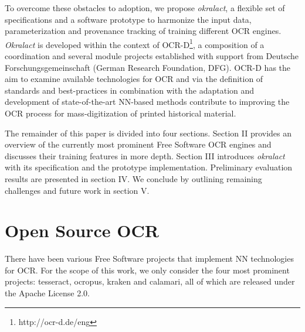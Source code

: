 \documentclass[conference]{IEEEtran}
\begin{document}
To overcome these obstacles to adoption, we propose
\textit{okralact}, a flexible set of specifications and a software
prototype to harmonize the input data, parameterization and
provenance tracking of training different OCR engines.
\textit{Okralact} is developed within the context of
OCR-D\footnote{http://ocr-d.de/eng}, a composition of a
coordination and several module projects established with support
from Deutsche Forschungsgemeinschaft (German Research Foundation,
DFG). OCR-D has the aim to examine available technologies for OCR
and via the definition of standards and best-practices in
combination with the adaptation and development of state-of-the-art
NN-based methods contribute to improving the OCR process for
mass-digitization of printed historical
material.\cite{neudecker2019datech}  



The remainder of this paper is divided into four sections. Section
II provides an overview of the currently most prominent Free
Software OCR engines and discusses their training features in more
depth. Section III introduces \textit{okralact} with its
specification and the prototype implementation. Preliminary
evaluation results are presented in section IV. We conclude by outlining 
remaining challenges and future work in section V. 

\section{Open Source OCR}

There have been various Free Software projects that implement NN technologies
for OCR. For the scope of this work, we only consider the four most prominent projects: tesseract, ocropus, kraken and calamari, all of which are released under the Apache License 2.0.

\end{document}
